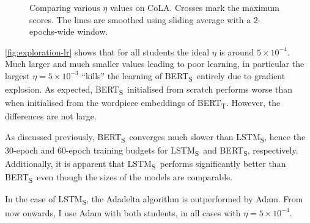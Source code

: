 \documentclass[bsc,frontabs,twoside,singlespacing,parskip,deptreport]{infthesis}
\def\BERTT{BERT\textsubscript{T}}
\def\BERTS{BERT\textsubscript{S}}
\def\LSTMS{LSTM\textsubscript{S}}
\def\sliding{The lines are smoothed using sliding average with a 2-epochs-wide window.}
\begin{document}
{{{      \begin{figure}[h!t]
        \centering
        \caption{Comparing various $\eta$ values on CoLA. Crosses mark the maximum scores. \sliding}
        \label{fig:exploration-lr}
      \end{figure}

      \autoref{fig:exploration-lr} shows that for all students the ideal $\eta$ is around $5\times10^{-4}$. Much larger and much smaller values leading to poor learning, in particular the largest $\eta=5\times10^{-3}$ ``kills'' the learning of \BERTS~entirely due to gradient explosion.
      As expected, \BERTS~initialised from scratch performs worse than when initialised from the wordpiece embeddings of \BERTT. However, the differences are not large.

      As discussed previously, \BERTS~converges much slower than \LSTMS, hence the 30-epoch and 60-epoch training budgets for \LSTMS~and \BERTS, respectively. Additionally, it is apparent that \LSTMS~performs significantly better than \BERTS~even though the sizes of the models are comparable.

      In the case of \LSTMS, the Adadelta algorithm is outperformed by Adam. From now onwards, I use Adam with both students, in all cases with $\eta=5\times10^{-4}$.
    }

}}
\end{document}
